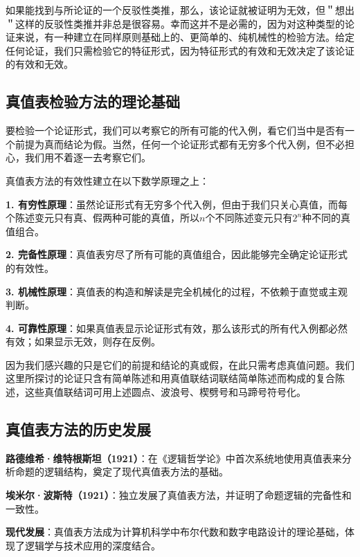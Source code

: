 如果能找到与所论证的一个反驳性类推，那么，该论证就被证明为无效，但＂想出＂这样的反驳性类推并非总是很容易。幸而这并不是必需的，因为对这种类型的论证来说，有一种建立在同样原则基础上的、更简单的、纯机械性的检验方法。给定任何论证，我们只需检验它的特征形式，因为特征形式的有效和无效决定了该论证的有效和无效。

\subsection{真值表检验方法的理论基础}

要检验一个论证形式，我们可以考察它的所有可能的代入例，看它们当中是否有一个前提为真而结论为假。当然，任何一个论证形式都有无穷多个代入例，但不必担心，我们用不着逐一去考察它们。

\begin{theorembox}[title=真值表方法的数学原理]
真值表方法的有效性建立在以下数学原理之上：

\textbf{1. 有穷性原理}：虽然论证形式有无穷多个代入例，但由于我们只关心真值，而每个陈述变元只有真、假两种可能的真值，所以$n$个不同陈述变元只有$2^n$种不同的真值组合。

\textbf{2. 完备性原理}：真值表穷尽了所有可能的真值组合，因此能够完全确定论证形式的有效性。

\textbf{3. 机械性原理}：真值表的构造和解读是完全机械化的过程，不依赖于直觉或主观判断。

\textbf{4. 可靠性原理}：如果真值表显示论证形式有效，那么该形式的所有代入例都必然有效；如果显示无效，则存在反例。
\end{theorembox}

因为我们感兴趣的只是它们的前提和结论的真或假，在此只需考虑真值问题。我们这里所探讨的论证只含有简单陈述和用真值联结词联结简单陈述而构成的复合陈述，这些真值联结词可用上述圆点、波浪号、楔劈号和马蹄号符号化。

\subsection{真值表方法的历史发展}

\begin{examplebox}[title=真值表方法的历史里程碑]
\textbf{路德维希·维特根斯坦（1921）}：在《逻辑哲学论》中首次系统地使用真值表来分析命题的逻辑结构，奠定了现代真值表方法的基础。

\textbf{埃米尔·波斯特（1921）}：独立发展了真值表方法，并证明了命题逻辑的完备性和一致性。

\textbf{现代发展}：真值表方法成为计算机科学中布尔代数和数字电路设计的理论基础，体现了逻辑学与技术应用的深度结合。
\end{examplebox}

